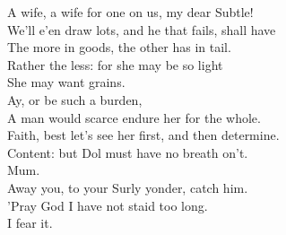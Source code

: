 \documentclass[a4paper,oneside]{memoir}
\begin{document}
\begin{drama*}
\facespeaks A wife, a wife for one on us, my dear Subtle!\\
We'll e'en draw lots, and he that fails, shall have\\
The more in goods, the other has in tail.\\
\subtlespeaks Rather the less: for she may be so light\\
She may want grains.\\
\facespeaks {} Ay, or be such a burden,\\
A man would scarce endure her for the whole.\\
\subtlespeaks Faith, best let's see her first, and then determine.\\
\facespeaks Content: but Dol must have no breath on't.\\
\subtlespeaks {} Mum.\\
Away you, to your Surly yonder, catch him.\\
\facespeaks 'Pray God I have not staid too long.\\
\subtlespeaks {} I fear it.\\
\act

\scene


\end{drama*}
\end{document}
